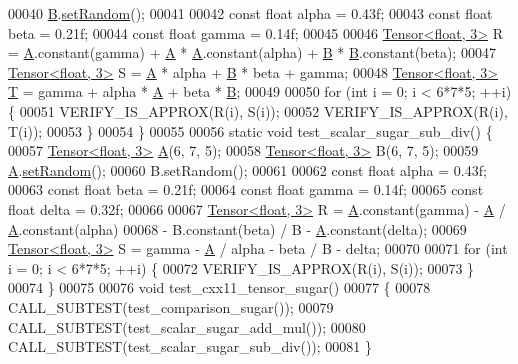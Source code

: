 \begin{DoxyCode}
00040   \hyperlink{group___core___module_class_eigen_1_1_matrix}{B}.\hyperlink{class_eigen_1_1_plain_object_base_af0e576a0e1aefc9ee346de44cc352ba3}{setRandom}();
00041 
00042   \textcolor{keyword}{const} \textcolor{keywordtype}{float} alpha = 0.43f;
00043   \textcolor{keyword}{const} \textcolor{keywordtype}{float} beta = 0.21f;
00044   \textcolor{keyword}{const} \textcolor{keywordtype}{float} gamma = 0.14f;
00045 
00046   \hyperlink{class_eigen_1_1_tensor}{Tensor<float, 3>} R = \hyperlink{group___core___module_class_eigen_1_1_matrix}{A}.constant(gamma) + \hyperlink{group___core___module_class_eigen_1_1_matrix}{A} * \hyperlink{group___core___module_class_eigen_1_1_matrix}{A}.constant(alpha) + 
      \hyperlink{group___core___module_class_eigen_1_1_matrix}{B} * \hyperlink{group___core___module_class_eigen_1_1_matrix}{B}.constant(beta);
00047   \hyperlink{class_eigen_1_1_tensor}{Tensor<float, 3>} S = \hyperlink{group___core___module_class_eigen_1_1_matrix}{A} * alpha + \hyperlink{group___core___module_class_eigen_1_1_matrix}{B} * beta + gamma;
00048   \hyperlink{class_eigen_1_1_tensor}{Tensor<float, 3>} \hyperlink{group___sparse_core___module}{T} = gamma + alpha * \hyperlink{group___core___module_class_eigen_1_1_matrix}{A} + beta * \hyperlink{group___core___module_class_eigen_1_1_matrix}{B};
00049 
00050   \textcolor{keywordflow}{for} (\textcolor{keywordtype}{int} i = 0; i < 6*7*5; ++i) \{
00051     VERIFY\_IS\_APPROX(R(i), S(i));
00052     VERIFY\_IS\_APPROX(R(i), T(i));
00053   \}
00054 \}
00055 
00056 \textcolor{keyword}{static} \textcolor{keywordtype}{void} test\_scalar\_sugar\_sub\_div() \{
00057   \hyperlink{class_eigen_1_1_tensor}{Tensor<float, 3>} \hyperlink{group___core___module_class_eigen_1_1_matrix}{A}(6, 7, 5);
00058   \hyperlink{class_eigen_1_1_tensor}{Tensor<float, 3>} B(6, 7, 5);
00059   \hyperlink{group___core___module_class_eigen_1_1_matrix}{A}.\hyperlink{class_eigen_1_1_plain_object_base_af0e576a0e1aefc9ee346de44cc352ba3}{setRandom}();
00060   B.setRandom();
00061 
00062   \textcolor{keyword}{const} \textcolor{keywordtype}{float} alpha = 0.43f;
00063   \textcolor{keyword}{const} \textcolor{keywordtype}{float} beta = 0.21f;
00064   \textcolor{keyword}{const} \textcolor{keywordtype}{float} gamma = 0.14f;
00065   \textcolor{keyword}{const} \textcolor{keywordtype}{float} delta = 0.32f;
00066 
00067   \hyperlink{class_eigen_1_1_tensor}{Tensor<float, 3>} R = \hyperlink{group___core___module_class_eigen_1_1_matrix}{A}.constant(gamma) - \hyperlink{group___core___module_class_eigen_1_1_matrix}{A} / \hyperlink{group___core___module_class_eigen_1_1_matrix}{A}.constant(alpha)
00068       - B.constant(beta) / B - \hyperlink{group___core___module_class_eigen_1_1_matrix}{A}.constant(delta);
00069   \hyperlink{class_eigen_1_1_tensor}{Tensor<float, 3>} S = gamma - \hyperlink{group___core___module_class_eigen_1_1_matrix}{A} / alpha - beta / B - delta;
00070 
00071   \textcolor{keywordflow}{for} (\textcolor{keywordtype}{int} i = 0; i < 6*7*5; ++i) \{
00072     VERIFY\_IS\_APPROX(R(i), S(i));
00073   \}
00074 \}
00075 
00076 \textcolor{keywordtype}{void} test\_cxx11\_tensor\_sugar()
00077 \{
00078   CALL\_SUBTEST(test\_comparison\_sugar());
00079   CALL\_SUBTEST(test\_scalar\_sugar\_add\_mul());
00080   CALL\_SUBTEST(test\_scalar\_sugar\_sub\_div());
00081 \}
\end{DoxyCode}
